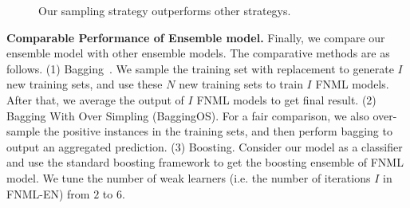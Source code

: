 \documentclass[conference]{IEEEtran}
\begin{document}
\begin{figure}[t]
\centering
{}
\vspace*{-10pt}
\caption{Our sampling strategy outperforms other strategys.}\label{fig:samplingstrategy}
\end{figure}

\textbf{Comparable Performance of Ensemble model.} 
Finally, we compare our ensemble model with other ensemble models. The comparative methods are as follows. (1) Bagging~\cite{Bagging}. We sample the training set with replacement to generate $I$ new training sets, and use these $N$ new training sets to train $I$ FNML models. After that, we average the output of $I$ FNML models to get final result. (2) Bagging With Over Simpling (BaggingOS). For a fair comparison, we also over-sample the positive instances in the training sets, and then perform bagging to output an aggregated prediction. (3) Boosting. Consider our model as a classifier and use the standard boosting framework to get the boosting ensemble of FNML model.  We tune the number of weak learners (i.e. the number of iterations $I$ in FNML-EN) from $2$ to $6$. 
\end{document}
